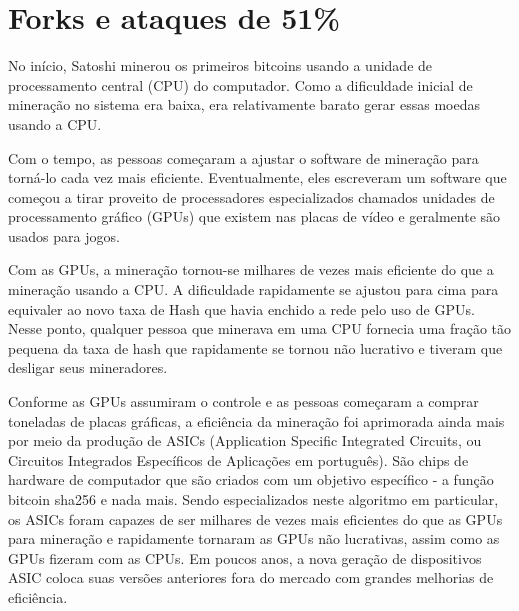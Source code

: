

\chapter{Forks e ataques de 51\%}


No início, Satoshi minerou os primeiros bitcoins usando a unidade de processamento central (CPU) do computador.
Como a dificuldade inicial de mineração no sistema era baixa, era relativamente barato gerar essas moedas usando a CPU.

Com o tempo, as pessoas começaram a ajustar o software de mineração para torná-lo cada vez mais eﬁciente.
Eventualmente, eles escreveram um software que começou a tirar proveito de processadores especializados chamados unidades de processamento gráfico (GPUs) que existem nas placas de vídeo e geralmente são usados para jogos.

Com as GPUs, a mineração tornou-se milhares de vezes mais eficiente do que a mineração usando a CPU.
A dificuldade rapidamente se ajustou para cima para equivaler ao novo taxa de Hash que havia enchido a rede pelo uso de GPUs.
Nesse ponto, qualquer pessoa que minerava em uma CPU fornecia uma fração tão pequena da taxa de hash que rapidamente se tornou não lucrativo e tiveram que desligar seus mineradores.

Conforme as GPUs assumiram o controle e as pessoas começaram a comprar toneladas de placas gráficas, a eficiência da mineração foi aprimorada ainda mais por meio da produção de ASICs (Application Specific Integrated Circuits, ou Circuitos Integrados Específicos de Aplicações em português).
São chips de hardware de computador que são criados com um objetivo específico - a função bitcoin sha256 e nada mais. 
Sendo especializados neste algoritmo em particular, os ASICs foram capazes de ser milhares de vezes mais eficientes do que as GPUs para mineração e rapidamente tornaram as GPUs não lucrativas, assim como as GPUs fizeram com as CPUs.
Em poucos anos, a nova geração de dispositivos ASIC coloca suas versões anteriores fora do mercado com grandes melhorias de eficiência.

